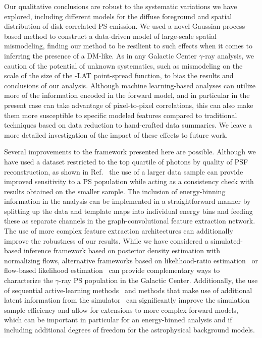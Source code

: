 \documentclass[prd,aps,10pt,nofootinbib,twocolumn,superscriptaddress,preprintnumbers,balancelastpage,longbibliography]{revtex4-1}
\begin{document}
Our qualitative conclusions are robust to the systematic variations we have explored, including different models for the diffuse foreground and spatial distribution of disk-correlated PS emission. We used a novel Gaussian process-based method to construct a data-driven model of large-scale spatial mismodeling, finding our method to be resilient to such effects when it comes to inferring the presence of a DM-like. As in any Galactic Center $\gamma$-ray analysis, we caution of the potential of unknown systematics, such as mismodeling on the scale of the size of the \Fermi-LAT point-spread function, to bias the results and conclusions of our analysis. Although machine learning-based analyses can utilize more of the information encoded in the forward model, and in particular in the present case can take advantage of pixel-to-pixel correlations, this can also make them more susceptible to specific modeled features compared to traditional techniques based on data reduction to hand-crafted data summaries. We leave a more detailed investigation of the impact of these effects to future work.

Several improvements to the framework presented here are possible. Although we have used a dataset restricted to the top quartile of photons by quality of PSF reconstruction, as shown in Ref.~\cite{Leane:2020pfc} the use of a larger data sample can provide improved sensitivity to a PS population while acting as a consistency check with results obtained on the smaller sample. The inclusion of energy-binning information in the analysis can be implemented in a straightforward manner by splitting up the data and template maps into individual energy bins and feeding these as separate channels in the graph-convolutional feature extraction network. The use of more complex feature extraction architectures can additionally improve the robustness of our results. 
While we have considered a simulated-based inference framework based on posterior density estimation with normalizing flows, alternative frameworks based on likelihood-ratio estimation~\cite{Brehmer:2018eca,Brehmer:2018hga,Brehmer:2018kdj,Cranmer:2015bka, Hermans:2019ioj,Miller:2020hua,Miller:2021hys} or flow-based likelihood estimation~\cite{winkler2019learning,papamakarios2019sequential} can provide complementary ways to characterize the $\gamma$-ray PS population in the Galactic Center. Additionally, the use of sequential active-learning methods~\cite{papamakarios2019sequential} and methods that make use of additional latent information from the simulator~\cite{Brehmer:2018eca,Brehmer:2018hga,Brehmer:2018kdj,Brehmer:2019xox,Stoye:2018ovl} can significantly improve the simulation sample efficiency and allow for extensions to more complex forward models, which can be important in particular for an energy-binned analysis and if including additional degrees of freedom for the astrophysical background models. 
\end{document}
